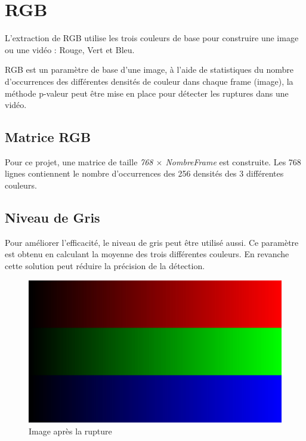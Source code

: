 \section{RGB}
L’extraction de RGB utilise les trois couleurs de base pour construire une image ou une vidéo : Rouge, Vert et Bleu.

RGB est un paramètre de base d’une image, à l’aide de statistiques du nombre d’occurrences des différentes densités de couleur dans chaque frame (image), la méthode p-valeur peut être mise en place pour détecter les ruptures dans une vidéo.

\subsection{Matrice RGB}

Pour ce projet, une matrice de taille \textit{768 $\times$ NombreFrame} est construite. Les 768 lignes contiennent le nombre d’occurrences des 256 densités des 3 différentes couleurs.

\subsection{Niveau de Gris}
Pour améliorer l’efficacité, le niveau de gris peut être utilisé aussi. Ce paramètre est obtenu en calculant la moyenne des trois différentes couleurs. En revanche cette solution peut réduire la précision de la détection.

\begin{figure}[h!]
      \centering
      \includegraphics[scale=0.12]{images/RGB.jpg}
      \caption{\label{Après} Image après la rupture}
\end{figure}


